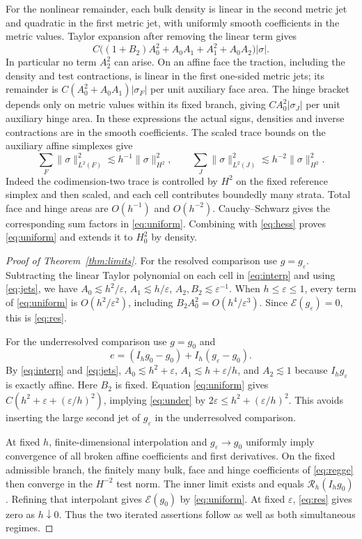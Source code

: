 \documentclass[11pt]{article}
\newcommand{\Rcal}{\mathcal R}
\newcommand{\Ecal}{\mathcal E}
\begin{document}
For the nonlinear remainder, each bulk density is linear
in the second metric jet and quadratic in the first metric
jet, with uniformly smooth coefficients in the metric values.
Taylor expansion after removing the linear term gives
\[
 C\big((1+B_2)A_0^2+A_0A_1+A_1^2+A_0A_2\big)|\sigma|.
\]
In particular no term \(A_2^2\) can arise. On an affine face
the traction, including the density and test contractions, is
linear in the first one-sided metric jets; its remainder is
\(C(A_0^2+A_0A_1)|\sigma_F|\) per unit auxiliary face area.
The hinge bracket depends only on metric values within its
fixed branch, giving \(CA_0^2|\sigma_J|\) per unit auxiliary
hinge area. In these expressions the actual signs, densities
and inverse contractions are in the smooth coefficients.
The scaled trace bounds on the auxiliary affine simplexes
give
\[
 \sum_F\|\sigma\|_{L^2(F)}^2\lesssim h^{-1}\|\sigma\|_{H^2}^2,
 \qquad
 \sum_J\|\sigma\|_{L^2(J)}^2\lesssim h^{-2}\|\sigma\|_{H^2}^2 .
\]
Indeed the codimension-two trace is controlled by \(H^2\) on
the fixed reference simplex and then scaled, and each cell
contributes boundedly many strata. Total face and hinge areas
are \(O(h^{-1})\) and \(O(h^{-2})\). Cauchy--Schwarz gives the
corresponding sum factors in \eqref{eq:uniform}. Combining
with \eqref{eq:hess} proves \eqref{eq:uniform} and extends it
to \(H^2_0\) by density.

\begin{proof}[Proof of Theorem~\ref{thm:limits}]
For the resolved comparison use \(g=g_\varepsilon\). Subtracting
the linear Taylor polynomial on each cell in \eqref{eq:interp}
and using \eqref{eq:jets}, we have
\(A_0\lesssim h^2/\varepsilon\), \(A_1\lesssim h/\varepsilon\),
\(A_2,B_2\lesssim\varepsilon^{-1}\).
When \(h\le\varepsilon\le1\), every term of
\eqref{eq:uniform} is \(O(h^2/\varepsilon^2)\), including
\(B_2A_0^2=O(h^4/\varepsilon^3)\).
Since \(\Ecal(g_\varepsilon)=0\), this is \eqref{eq:res}.

For the underresolved comparison use \(g=g_0\) and
\[
       e=(I_hg_0-g_0)+I_h(g_\varepsilon-g_0).
\]
By \eqref{eq:interp} and \eqref{eq:jets},
\(A_0\lesssim h^2+\varepsilon\), \(A_1\lesssim h+\varepsilon/h\),
and \(A_2\lesssim1\) because \(I_hg_\varepsilon\) is exactly
affine. Here \(B_2\) is fixed. Equation \eqref{eq:uniform}
gives \(C(h^2+\varepsilon+(\varepsilon/h)^2)\), implying
\eqref{eq:under} by \(2\varepsilon\le h^2+(\varepsilon/h)^2\).
This avoids inserting the large second jet of \(g_\varepsilon\)
in the underresolved comparison.

At fixed \(h\), finite-dimensional interpolation and
\(g_\varepsilon\to g_0\) uniformly imply convergence of all
broken affine coefficients and first derivatives.
On the fixed admissible branch, the finitely many bulk,
face and hinge coefficients of \eqref{eq:regge} then converge
in the \(H^{-2}\) test norm. The inner limit exists and equals
\(\Rcal_h(I_hg_0)\). Refining that interpolant gives
\(\Ecal(g_0)\) by \eqref{eq:uniform}. At fixed \(\varepsilon\),
\eqref{eq:res} gives zero as \(h\downarrow0\). Thus the two
iterated assertions follow as well as both simultaneous regimes.
\end{proof}
\end{document}
